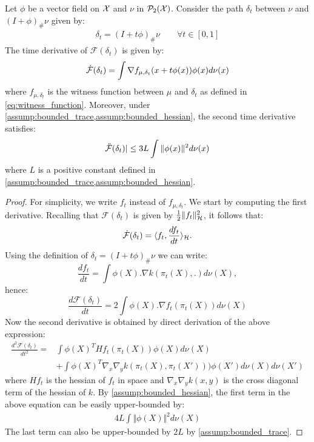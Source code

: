 \begin{lemma}\label{lem:derivative_mmd}
	Let $\phi$ be a vector field on ${{\mathcal X}}$ and $\nu$ in $\mathcal{P}_2({{\mathcal X}})$. Consider the path $\delta_t$ between $\nu$ and $(I+\phi)_{\#}\nu$ given by:
	\begin{align*}
		\delta_t=  (I+t\phi)_{\#}\nu \qquad \forall t\in [0,1]
	\end{align*}
The time derivative of $\mathcal{F}(\delta_t)$ is given by:
	\begin{align*}
		\dot{{{\mathcal F}}}(\delta_t)&=\int \nabla f_{\mu,\delta_t}(x+t\phi(x)) \phi(x)d\nu(x)\\
	\end{align*}
where $f_{\mu,\delta_t}$ is the witness function between $\mu$ and $\delta_t$ as defined in \cref{eq:witness_function}.	
	Moreover, under \cref{assump:bounded_trace,assump:bounded_hessian}, the second time derivative satisfies:
	\begin{align*}
		\ddot{{{\mathcal F}}}(\delta_t) \vert \leq 3L \int \Vert \phi(x) \Vert^2 d\nu(x)
	\end{align*}
	where $L$ is a positive constant defined in \cref{assump:bounded_trace,assump:bounded_hessian}.
	
\end{lemma}
\begin{proof}
For simplicity, we write $f_t$ instead of $f_{\mu,\delta_t}$.
We start by computing the first derivative. Recalling that $\mathcal{F}(\delta_t)$ is given by $\frac{1}{2}\Vert f_t\Vert^2_{{{\mathcal H}}} $, it follows that:
\[
\dot{{{\mathcal F}}}(\delta_t)=\langle f_{t},\frac{df_{t}}{dt}\rangle_{{{\mathcal H}}}.
\]
Using the definition
of $\delta_{t}=(I+t\phi)_{\#}\nu$ we can write:
\[
\frac{df_{t}}{dt}=\int \phi(X).\nabla k(\pi_{t}(X),.)d\nu(X),
\]
hence:
\[
\frac{d\mathcal{F}(\delta_{t})}{dt}=2\int\phi(X).\nabla f_{t}(\pi_{t}(X))d\nu(X)
\]
Now the second derivative is obtained by direct derivation of the above expression:
	\begin{align*}
		\frac{d^2 \mathcal{F}(\delta_t)}{dt^2} =& \int \phi(X)^THf_t(\pi_t(X))\phi(X)d\nu(X)\\ 
		&+\int \phi(X)^T\nabla_x\nabla_y k(\pi_t(X),\pi_t(X')) ) \phi(X')d\nu(X)d\nu(X') 
	\end{align*}
where $Hf_t$ is the hessian of $f_t$ in space and  $\nabla_x\nabla_y k(x,y)$ is the cross diagonal term of the hessian of $k$. By \cref{assump:bounded_hessian}, the first term in the above equation can be easily upper-bounded by:
\begin{align*}
	4L \int \Vert \phi(X)\Vert^2d\nu(X)  
\end{align*}
The last term can also be upper-bounded by $2L$ by \cref{assump:bounded_trace}.
\end{proof}



